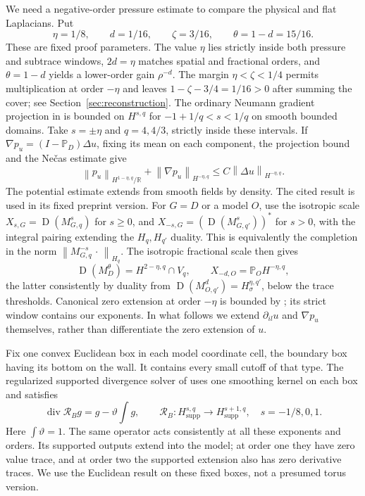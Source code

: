 \documentclass[11pt]{article}
\numberwithin{equation}{section}
\theoremstyle{remark}
\newcommand{\R}{\mathbb R}
\newcommand{\PP}{\mathbb P}
\newcommand{\divg}{\operatorname{div}}
\newcommand{\norm}[1]{\left\lVert#1\right\rVert}
\DeclareMathOperator{\Dom}{D}
\begin{document}
We need a negative-order pressure estimate to compare the physical and
flat Laplacians. Put
\begin{equation}\label{eq:buffers}
 \eta=1/8,\qquad d=1/16,\qquad \zeta=3/16,\qquad
 \theta=1-d=15/16.
\end{equation}
These are fixed proof parameters. The value $\eta$ lies strictly
inside both pressure and subtrace windows, $2d=\eta$ matches spatial
and fractional orders, and $\theta=1-d$ yields a lower-order gain
$\rho^{-d}$. The margin $\eta<\zeta<1/4$ permits multiplication
at order $-\eta$ and leaves
$1-\zeta-3/4=1/16>0$ after summing the cover; see
Section~\ref{sec:reconstruction}.
The ordinary Neumann gradient projection in
\cite[Theorem 4.38, Proposition 4.39]{BG} is bounded on $H^{s,q}$
for $-1+1/q<s<1/q$ on smooth bounded domains. Take $s=\pm\eta$
and $q=4,4/3$, strictly inside these intervals. If
$\nabla p_u=(I-\PP_D)\Delta u$, fixing its mean on each component,
the projection bound and the Ne\v cas estimate
\cite[Lemma 2.12]{BG} give
\begin{equation}\label{eq:negative-pressure}
 \norm{p_u}_{H^{1-\eta,q}/\R}
 +\norm{\nabla p_u}_{H^{-\eta,q}}
 \leq C\norm{\Delta u}_{H^{-\eta,q}}.
\end{equation}
The potential estimate extends from smooth fields by density.
The cited result is used in its fixed preprint version.
For $G=D$ or a model $O$, use the isotropic scale
$X_{s,G}=\Dom(M_{G,q}^s)$ for $s\geq0$, and
$X_{-s,G}=(\Dom(M_{G,q'}^s))^*$ for $s>0$, with the integral
pairing extending the $H_q,H_{q'}$ duality. This is equivalently the
completion in the norm $\norm{M_{G,q}^{-s}\,\cdot\,}_{H_q}$.
The isotropic fractional scale then gives
\[
 \Dom(M_D^\theta)=H^{2-\eta,q}\cap V_q,
 \qquad X_{-d,O}=\PP_OH^{-\eta,q},
\]
the latter consistently by duality from
$\Dom(M_{O,q'}^d)=H^{\eta,q'}_\sigma$, below the trace thresholds.
Canonical zero extension at order $-\eta$ is bounded by
\cite[Proposition 2.4]{BG}; its strict window contains our exponents.
In what follows we extend $\partial_{il}u$ and $\nabla p_u$
themselves, rather than differentiate the zero extension of $u$.

Fix one convex Euclidean box in each model coordinate cell, the
boundary box having its bottom on the wall. It contains every small
cutoff of that type. The regularized supported divergence solver of
\cite[formula (3.13), Theorem 3.2, Corollary 3.4, Remark 3.5]{CM}
uses one smoothing kernel on each box and satisfies
\begin{equation}\label{eq:bogovskii}
 \divg\mathcal R_B g=g-\vartheta\int g,\qquad
 \mathcal R_B:H^{s,q}_{\mathrm{supp}}\to
 H^{s+1,q}_{\mathrm{supp}},\quad s=-1/8,0,1.
\end{equation}
Here $\int\vartheta=1$. The same operator acts consistently at all
these exponents and orders. Its supported outputs extend into the
model; at order one they have zero value trace, and at order two
the supported extension also has zero derivative traces. We use the
Euclidean result on these fixed boxes, not a presumed torus version.
\end{document}
